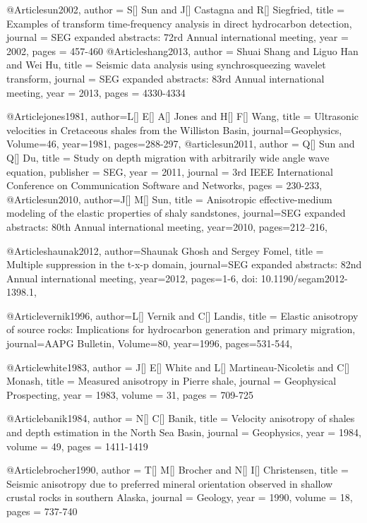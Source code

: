 @Article{sun2002,
  author = 	 {S[] Sun and J[] Castagna and R[] Siegfried},
  title = 	 {Examples of 
   transform time-frequency analysis in direct hydrocarbon detection},
  journal = 	 {SEG expanded abstracts: 72rd Annual international meeting},
  year = 	 2002,
  pages = 	 {457-460}
}
@Article{shang2013,
  author = 	 {Shuai Shang and Liguo Han and Wei Hu},
  title = 	 {Seismic data analysis using synchrosqueezing wavelet transform},
  journal = 	 {SEG expanded abstracts: 83rd Annual international meeting},
  year = 	 2013,
  pages = 	 {4330-4334}
}

@Article{jones1981,
  author={L[] E[] A[] Jones and H[] F[] Wang},
  title = {Ultrasonic velocities in Cretaceous shales from the Williston Basin},
  journal={Geophysics},
  Volume=46,
  year=1981,
  pages={288-297},
}
@article{sun2011,
  author =	 {Q[] Sun and Q[] Du},
  title =	 {Study on depth migration with arbitrarily wide angle wave equation},
  publisher =	 {SEG},
  year =	 2011,
  journal =	 {3rd IEEE International Conference on Communication Software and Networks},
  pages =	 {230-233},
}
@Article{sun2010,
  author={J[] M[] Sun},
  title = {Anisotropic effective-medium modeling of the elastic properties of shaly sandstones},
  journal={SEG expanded abstracts: 80th Annual international meeting},
  year=2010,
  pages={212–216},
}


@Article{shaunak2012,
  author={Shaunak Ghosh and Sergey Fomel},
  title = {Multiple suppression in the t-x-p domain},
  journal={SEG expanded abstracts: 82nd Annual international meeting},
  year=2012,
  pages={1-6, doi: 10.1190/segam2012-1398.1},
}

@Article{vernik1996,
  author={L[] Vernik and C[] Landis},
  title = {Elastic anisotropy of source rocks: Implications for hydrocarbon
generation and primary migration},
  journal={AAPG Bulletin},
  Volume=80,
  year=1996,
  pages={531-544},
}

@Article{white1983,
  author = 	 {J[] E[] White and L[] Martineau-Nicoletis and C[] Monash},
  title = 	 {Measured anisotropy in Pierre shale},
  journal = 	 {Geophysical Prospecting},
  year = 	 1983,
  volume =	 31,
  pages =	 {709-725}
}

@Article{banik1984,
  author = 	 {N[] C[] Banik},
  title = 	 {Velocity anisotropy of shales and depth estimation
in the North Sea Basin},
  journal = 	 {Geophysics},
  year = 	 1984,
  volume =	 49,
  pages =	 {1411-1419}
}

@Article{brocher1990,
  author = 	 {T[] M[] Brocher and N[] I[] Christensen},
  title = 	 {Seismic anisotropy due to preferred mineral orientation observed in shallow crustal rocks
in southern Alaska},
  journal = 	 {Geology},
  year = 	 1990,
  volume =	 18,
  pages =	 {737-740}
}

